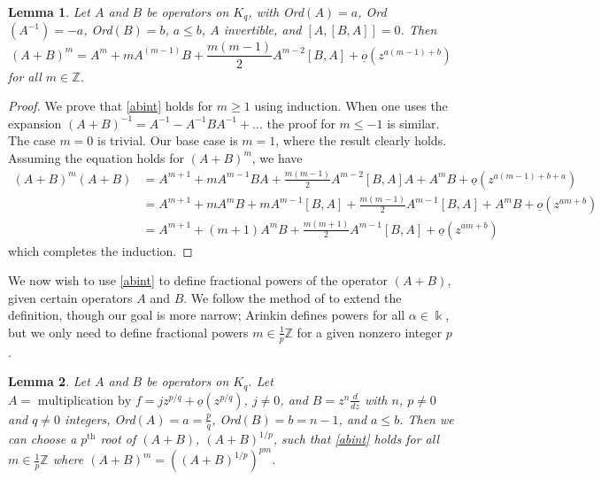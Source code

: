 \documentclass[11pt]{amsart}
\theoremstyle{theorem}
\theoremstyle{lemma}
\newtheorem{lemma}{Lemma}
\theoremstyle{corollary}
\theoremstyle{proposition}
\theoremstyle{definition}
\theoremstyle{remark}
\begin{document}
\begin{lemma}\label{abintlemma}
    Let $A$ and $ B$ be operators on $K_q$, with Ord$(A)=a$, Ord$(A^{-1})=-a$, Ord$(B)=b$, $a\leq b$, $A$ invertible, and $[A,[B,A]]=0$.  Then
    \begin{equation}\label{abint}
        (A+B)^{m}=A^{m}+mA^{(m-1)}B+\frac{m(m-1)}{2}A^{m-2}[B,A] + \underline{o}(z^{a(m-1)+b})
    \end{equation}for all $m\in\mathbb{Z}$.
\end{lemma}
\begin{proof} We prove that \eqref{abint} holds for $m\geq 1$ using induction. When one uses the expansion $(A+B)^{-1}=A^{-1}-A^{-1}BA^{-1}+\dots$ the proof for $m\leq -1$ is similar.  The case $m=0$ is trivial.  Our base case is $m=1$, where the result clearly holds.  Assuming the equation holds for $(A+B)^m$, we have
    \begin{equation*}
    \begin{split}
        (A+B)^{m}(A+B) & = A^{m+1}+mA^{m-1}BA+\frac{m(m-1)}{2}A^{m-2}[B,A]A+A^mB + \underline{o}(z^{a(m-1)+b+a})\\
                    & = A^{m+1}+mA^{m}B+mA^{m-1}[B,A]+\frac{m(m-1)}{2}A^{m-1}[B,A]+A^mB + \underline{o}(z^{am+b})\\
                    & = A^{m+1}+(m+1)A^{m}B+\frac{m(m+1)}{2}A^{m-1}[B,A] + \underline{o}(z^{am+b})
    \end{split}
    \end{equation*}which completes the induction.
\end{proof}

We now wish to use \eqref{abint} to define fractional powers of the operator $(A+B)$, given certain operators $A$ and $B$.  We follow the method of \cite[Section 7.1]{dima} to extend the definition, though our goal is more narrow; Arinkin defines powers for all $\alpha\in \Bbbk$, but we only need to define fractional powers $m\in\frac{1}{p}\mathbb{Z}$ for a given nonzero integer $p$.
\begin{lemma}\label{abratlemma}
    Let $A$ and $B$ be operators on $K_q$. Let $A=\text{ multiplication by } f= jz^{p/q}+ \underline{o}(z^{p/q})$, $j\neq 0$, and $B=z^n\frac{d}{dz}$ with $n$, $p\neq 0$ and $q\neq 0$ integers, Ord$(A)=a=\frac{p}{q}$, Ord$(B)=b=n-1$, and $a\leq b$. Then we can choose a $p^{\text{th}}$ root of $(A+B)$, $(A+B)^{1/p}$, such that \eqref{abint} holds for all $m\in \frac{1}{p}\mathbb{Z}$ where $(A+B)^{m}=((A+B)^{1/p})^{pm}$.
\end{lemma}
\end{document}
